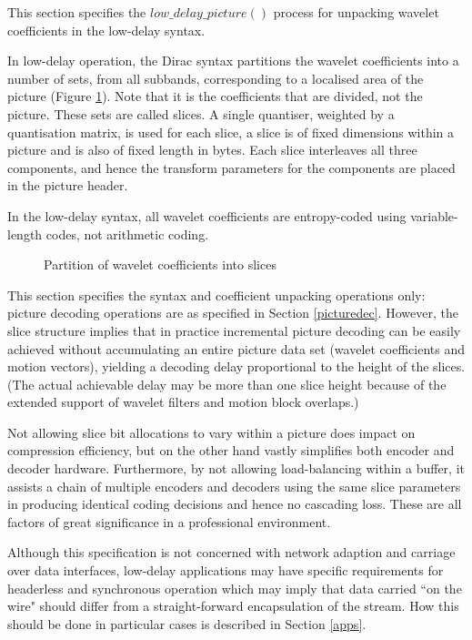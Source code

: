 \label{lowdelayparsing}

This section specifies the $low\_delay\_picture()$ process for unpacking 
wavelet coefficients in the low-delay syntax.

In low-delay operation, the Dirac syntax partitions the wavelet coefficients into a number of sets,
from all subbands, corresponding to a localised area of the picture (Figure \ref{fig:waveletslice}).
Note that it is the coefficients that are divided,
not the picture. These sets are called slices. A single quantiser, weighted by a quantisation matrix, is used for each slice, 
a slice is  of fixed dimensions within a picture and is also of fixed length in bytes. Each slice interleaves all three components, and hence
the transform parameters for the components are placed in the picture header.

In the low-delay syntax, all wavelet coefficients are entropy-coded using variable-length
codes, not arithmetic coding.

\begin{figure}[!ht]
\centering
\caption{Partition of wavelet coefficients into slices}
\label{fig:waveletslice}
\end{figure}

This section specifies the syntax and coefficient unpacking operations only: picture decoding operations are as specified in Section \ref{picturedec}. However, the slice
structure implies that in practice incremental picture decoding can be easily achieved without
accumulating an entire picture data set (wavelet coefficients and motion vectors), yielding a decoding delay
proportional to the height of the slices. (The actual achievable delay may be more than one slice height because
of the extended support of wavelet filters and motion block overlaps.)

\begin{informative}
Not allowing slice bit allocations to vary within a picture does impact on
compression efficiency, but on the other hand vastly simplifies both encoder and decoder hardware. Furthermore, by
not allowing load-balancing within a buffer, it assists a chain of multiple encoders and decoders using the same
slice parameters in producing identical coding decisions and hence no cascading loss. These are all factors of great 
significance in a professional environment.
\end{informative}

Although this specification is not concerned with network adaption and carriage over data interfaces, low-delay
applications may have specific requirements for headerless and synchronous operation which may imply that
data carried ``on the wire" should differ from a straight-forward encapsulation of the stream. How this should
be done in particular cases is described in Section \ref{apps}.

